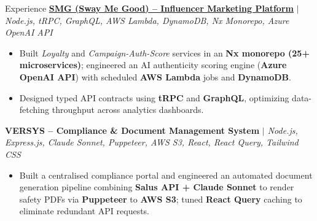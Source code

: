 \documentclass[10pt]{resume}
\begin{document}
\begin{rSection}{Experience}
\vspace{0.05em}
\textbf{\small\href{https://swaymegood.com/}{SMG (Sway Me Good) -- Influencer Marketing Platform}}
{\small\textit{$|$ Node.js, tRPC, GraphQL, AWS Lambda, DynamoDB, Nx Monorepo, Azure OpenAI API}}
\begin{itemize}[leftmargin=1.4em, itemsep=-0.38em, topsep=0.04em]
  \item Built \textit{Loyalty} and \textit{Campaign-Auth-Score} services in an \textbf{Nx monorepo (25+ microservices)}; engineered an AI authenticity scoring engine (\textbf{Azure OpenAI API}) with scheduled \textbf{AWS Lambda} jobs and \textbf{DynamoDB}.
  \item Designed typed API contracts using \textbf{tRPC} and \textbf{GraphQL}, optimizing data-fetching throughput across analytics dashboards.
\end{itemize}

\vspace{0.04em}
\textbf{\small VERSYS -- Compliance \& Document Management System}
{\small\textit{$|$ Node.js, Express.js, Claude Sonnet, Puppeteer, AWS S3, React, React Query, Tailwind CSS}}
\begin{itemize}[leftmargin=1.4em, itemsep=-0.38em, topsep=0.04em]
  \item Built a centralised compliance portal and engineered an automated document generation pipeline combining \textbf{Salus API + Claude Sonnet} to render safety PDFs via \textbf{Puppeteer} to \textbf{AWS S3}; tuned \textbf{React Query} caching to eliminate redundant API requests.
\end{itemize}

\end{rSection}

\newpage
\end{document}
